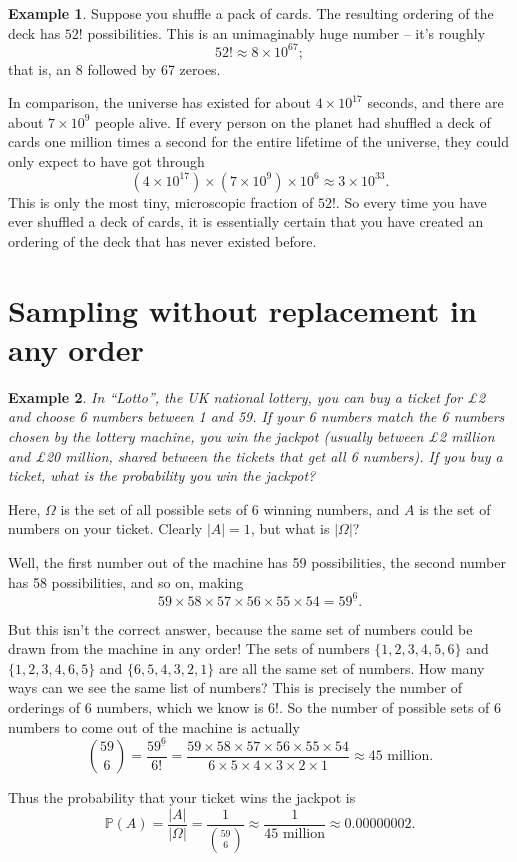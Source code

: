 \documentclass[
  a4paper,
]{book}
\theoremstyle{definition}
\theoremstyle{definition}
\newtheorem{example}{Example}[chapter]
\theoremstyle{definition}
\theoremstyle{definition}
\theoremstyle{remark}
\begin{document}
\begin{example}
Suppose you shuffle a pack of cards. The resulting ordering of the deck has \(52!\) possibilities. This is an unimaginably huge number -- it's roughly
\[ 52! \approx 8 \times 10^{67} ; \]
that is, an 8 followed by 67 zeroes.

In comparison, the universe has existed for about \(4 \times 10^{17}\) seconds, and there are about \(7 \times 10^{9}\) people alive. If every person on the planet had shuffled a deck of cards one million times a second for the entire lifetime of the universe, they could only expect to have got through
\[ (4 \times 10^{17}) \times (7 \times 10^{9}) \times 10^6 \approx 3 \times 10^{33} .\]
This is only the most tiny, microscopic fraction of \(52!\). So every time you have ever shuffled a deck of cards, it is essentially certain that you have created an ordering of the deck that has never existed before.
\end{example}

\hypertarget{combinations}{%
\section{Sampling without replacement in any order}\label{combinations}}

\begin{example}
\protect\hypertarget{exm:lotto}{}\label{exm:lotto}\emph{In ``Lotto'', the UK national lottery, you can buy a ticket for £2 and choose 6 numbers between 1 and 59. If your 6 numbers match the 6 numbers chosen by the lottery machine, you win the jackpot (usually between £2 million and £20 million, shared between the tickets that get all 6 numbers). If you buy a ticket, what is the probability you win the jackpot?}

Here, \(\Omega\) is the set of all possible sets of 6 winning numbers, and \(A\) is the set of numbers on your ticket. Clearly \(|A| = 1\), but what is \(|\Omega|\)?

Well, the first number out of the machine has 59 possibilities, the second number has 58 possibilities, and so on, making
\[ 59 \times 58 \times 57 \times 56 \times 55 \times 54 = {59}^{\underline{6}} . \]

But this isn't the correct answer, because the same set of numbers could be drawn from the machine in any order! The sets of numbers \(\{1,2,3,4,5,6\}\) and \(\{1,2,3,4,6,5\}\) and \(\{6,5,4,3,2,1\}\) are all the same set of numbers. How many ways can we see the same list of numbers? This is precisely the number of orderings of 6 numbers, which we know is \(6!\). So the number of possible sets of 6 numbers to come out of the machine is actually
\[ \binom{59}{6} = \frac{{59}^{\underline{6}}}{6!} = \frac{59 \times 58 \times 57 \times 56 \times 55 \times 54}{6\times5\times4\times3\times2\times1} \approx 45 \text{ million} . \]

Thus the probability that your ticket wins the jackpot is
\[ \mathbb P(A) = \frac{|A|}{|\Omega|} = \frac{1}{\binom{59}{6}} \approx \frac{1}{45 \text{ million}} \approx 0.00000002 . \]
\end{example}
\end{document}
